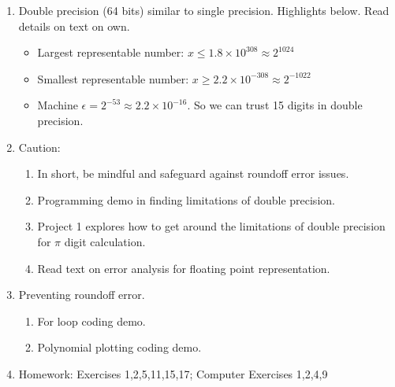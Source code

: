 \documentclass{article}
\newcommand{\ds}{\displaystyle}
\theoremstyle{remark}
\begin{document}
\begin{enumerate}
\item Double precision (64 bits) similar to single precision. Highlights below. Read details on text on own.
\begin{itemize}
\item Largest representable number: $\ds x \leq 1.8 \times 10^{308} \approx 2^{1024}$
\item Smallest representable number: $\ds x \geq 2.2 \times 10^{-308} \approx 2^{-1022}$
\item Machine $\ds \epsilon = 2^{-53} \approx 2.2 \times 10^{-16}$. So we can trust 15 digits in double precision.
\end{itemize}


\item Caution:
\begin{enumerate}
\item In short, be mindful and safeguard against roundoff error issues.  
\item Programming demo in finding limitations of double precision.
\item Project 1 explores how to get around the limitations of double precision for $\pi$ digit calculation.
\item Read text on error analysis for floating point representation.
\end{enumerate}

\item Preventing roundoff error.
\begin{enumerate}
\item For loop coding demo.
\item Polynomial plotting coding demo. 
\end{enumerate}

\item Homework: Exercises 1,2,5,11,15,17; 
Computer Exercises 1,2,4,9

\end{enumerate}


\end{document}
